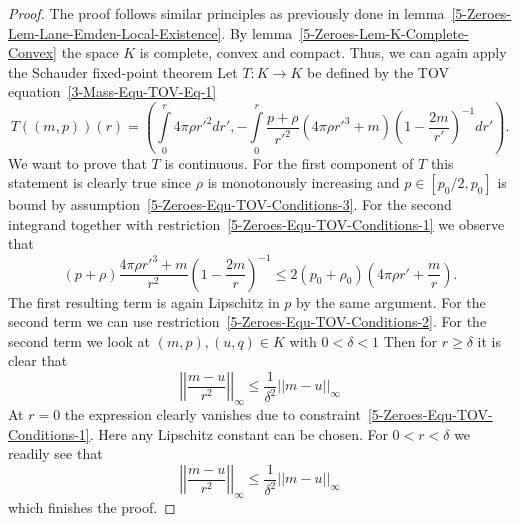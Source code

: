 \begin{proof}
	The proof follows similar principles as previously done in lemma~\ref{5-Zeroes-Lem-Lane-Emden-Local-Existence}.
	By lemma~\ref{5-Zeroes-Lem-K-Complete-Convex} the space $K$ is complete, convex and compact.
	Thus, we can again apply the Schauder fixed-point theorem
	Let $T:K\rightarrow K$ be defined by the \ac{TOV} equation~\eqref{3-Mass-Equ-TOV-Eq-1}
	\[
		T((m,p))(r)=\left(\int\limits_0^r 4\pi\rho r'^2 dr',-\int\limits_0^r\frac{p+\rho}{r'^2}(4\pi\rho r'^3 + m)\left(1-\frac{2m}{r'}\right)^{-1}dr'\right).
	\]
	We want to prove that $T$ is continuous.
	For the first component of $T$ this statement is clearly true since $\rho$ is monotonously increasing and $p\in[p_0/2,p_0]$ is bound by assumption~\eqref{5-Zeroes-Equ-TOV-Conditions-3}.
	For the second integrand together with restriction~\eqref{5-Zeroes-Equ-TOV-Conditions-1} we observe that
	\[
		(p+\rho)\frac{4\pi\rho r'^3+m}{r^2}\left(1-\frac{2 m}{r}\right)^{-1} \leq2(p_0+\rho_0)\left(4\pi\rho r'+\frac{m}{r}\right).
	\]
	The first resulting term is again Lipschitz in $p$ by the same argument.
	For the second term we can use restriction~\eqref{5-Zeroes-Equ-TOV-Conditions-2}.
	For the second term we look at $(m,p),(u,q)\in K$ with $0<\delta<1$
	Then for $r\geq\delta$ it is clear that
	\[
		\left|\left|\frac{m-u}{r^2}\right|\right|_{\infty}\leq\frac{1}{\delta^2}\left|\left|m-u\right|\right|_{\infty}
	\]
	At $r=0$ the expression clearly vanishes due to constraint~\eqref{5-Zeroes-Equ-TOV-Conditions-1}.
	Here any Lipschitz constant can be chosen.
	For $0<r<\delta$ we readily see that
	\[
		\left|\left|\frac{m-u}{r^2}\right|\right|_{\infty}\leq\frac{1}{\delta^2}\left|\left|m-u\right|\right|_{\infty}
	\]
	which finishes the proof.
\end{proof}